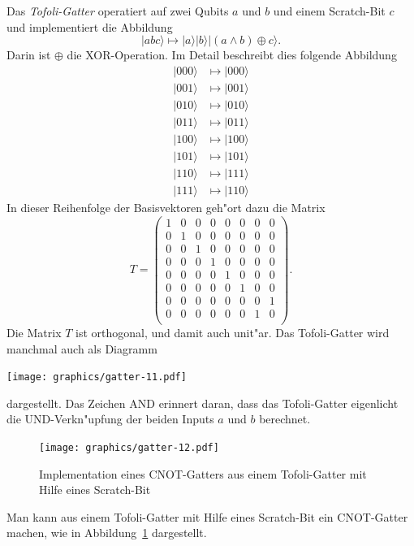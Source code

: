 \begin{beispiel}
Das {\em Tofoli-Gatter} operatiert auf zwei Qubits $a$ und $b$ und einem
Scratch-Bit $c$ und implementiert die Abbildung
\[
|abc\rangle
\mapsto
|a\rangle|b\rangle|(a\wedge b)\oplus c\rangle.
\]
Darin ist $\oplus$ die XOR-Operation. 
Im Detail beschreibt dies folgende Abbildung
\begin{align*}
|000\rangle&\mapsto|000\rangle\\
|001\rangle&\mapsto|001\rangle\\
|010\rangle&\mapsto|010\rangle\\
|011\rangle&\mapsto|011\rangle\\
|100\rangle&\mapsto|100\rangle\\
|101\rangle&\mapsto|101\rangle\\
|110\rangle&\mapsto|111\rangle\\
|111\rangle&\mapsto|110\rangle
\end{align*}
In dieser Reihenfolge der Basisvektoren geh"ort dazu die Matrix
\[
T=
\begin{pmatrix}
1&0&0&0&0&0&0&0\\
0&1&0&0&0&0&0&0\\
0&0&1&0&0&0&0&0\\
0&0&0&1&0&0&0&0\\
0&0&0&0&1&0&0&0\\
0&0&0&0&0&1&0&0\\
0&0&0&0&0&0&0&1\\
0&0&0&0&0&0&1&0\\
\end{pmatrix}.
\]
Die Matrix $T$ ist orthogonal, und damit auch unit"ar.
Das Tofoli-Gatter wird manchmal auch als Diagramm
\begin{center}
\texttt{[image: graphics/gatter-11.pdf]}
\end{center}
dargestellt. Das Zeichen \textsc{AND} erinnert daran, dass das Tofoli-Gatter
eigenlicht die UND-Verkn"upfung der beiden Inputs $a$ und $b$ berechnet.
\end{beispiel}

\begin{beispiel}
\begin{figure}
\centering
\texttt{[image: graphics/gatter-12.pdf]}
\caption{Implementation eines \textsc{CNOT}-Gatters aus einem Tofoli-Gatter
mit Hilfe eines Scratch-Bit \label{skript:cnot=tofoli}}
\end{figure}
Man kann aus einem Tofoli-Gatter mit Hilfe eines Scratch-Bit ein
\textsc{CNOT}-Gatter machen, wie in Abbildung~\ref{skript:cnot=tofoli}
dargestellt.
\end{beispiel}

